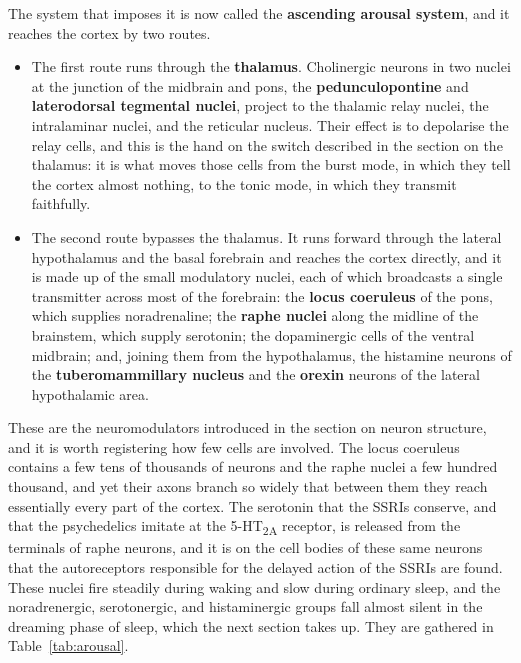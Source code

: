 \documentclass[11pt]{article}
\begin{document}
The system that imposes it is now called the \textbf{ascending arousal system}, and it reaches the cortex by two routes.

\begin{itemize}
    \item The first route runs through the \textbf{thalamus}. Cholinergic neurons in two nuclei at the junction of the midbrain and pons, the \textbf{pedunculopontine} and \textbf{laterodorsal tegmental nuclei}, project to the thalamic relay nuclei, the intralaminar nuclei, and the reticular nucleus. Their effect is to depolarise the relay cells, and this is the hand on the switch described in the section on the thalamus: it is what moves those cells from the burst mode, in which they tell the cortex almost nothing, to the tonic mode, in which they transmit faithfully.
    \item The second route bypasses the thalamus. It runs forward through the lateral hypothalamus and the basal forebrain and reaches the cortex directly, and it is made up of the small modulatory nuclei, each of which broadcasts a single transmitter across most of the forebrain: the \textbf{locus coeruleus} of the pons, which supplies noradrenaline; the \textbf{raphe nuclei} along the midline of the brainstem, which supply serotonin; the dopaminergic cells of the ventral midbrain; and, joining them from the hypothalamus, the histamine neurons of the \textbf{tuberomammillary nucleus} and the \textbf{orexin} neurons of the lateral hypothalamic area.
\end{itemize}

These are the neuromodulators introduced in the section on neuron structure, and it is worth registering how few cells are involved. The locus coeruleus contains a few tens of thousands of neurons and the raphe nuclei a few hundred thousand, and yet their axons branch so widely that between them they reach essentially every part of the cortex. The serotonin that the SSRIs conserve, and that the psychedelics imitate at the 5-HT\textsubscript{2A} receptor, is released from the terminals of raphe neurons, and it is on the cell bodies of these same neurons that the autoreceptors responsible for the delayed action of the SSRIs are found. These nuclei fire steadily during waking and slow during ordinary sleep, and the noradrenergic, serotonergic, and histaminergic groups fall almost silent in the dreaming phase of sleep, which the next section takes up. They are gathered in Table~\ref{tab:arousal}.
\end{document}
